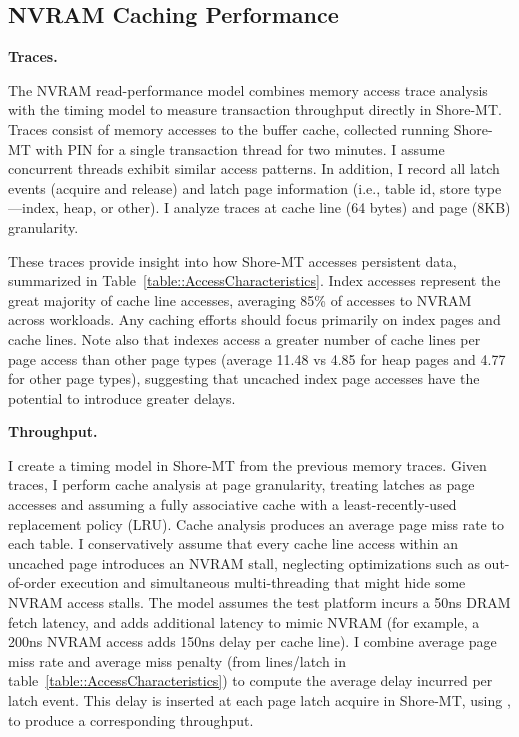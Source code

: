 \subsection{NVRAM Caching Performance}
\label{sec:OLTP_eval:Reads:Performance}

\textbf{Traces.}

The NVRAM read-performance model combines memory access trace analysis with the timing model to measure transaction throughput directly in Shore-MT.
Traces consist of memory accesses to the buffer cache, collected running Shore-MT with PIN for a single transaction thread for two minutes.
I assume concurrent threads exhibit similar access patterns.
In addition, I record all latch events (acquire and release) and latch page information (i.e., table id, store type---index, heap, or other).
I analyze traces at cache line (64 bytes) and page (8KB) granularity.

These traces provide insight into how Shore-MT accesses persistent data, summarized in Table~\ref{table::AccessCharacteristics}.
Index accesses represent the great majority of cache line accesses, averaging 85\% of accesses to NVRAM across workloads.
Any caching efforts should focus primarily on index pages and cache lines.
Note also that indexes access a greater number of cache lines per page access than other page types (average 11.48 vs 4.85 for heap pages and 4.77 for other page types), suggesting that uncached index page accesses have the potential to introduce greater delays.

\textbf{Throughput.}

I create a timing model in Shore-MT from the previous memory traces.
Given traces, I perform cache analysis at page granularity, treating latches as page accesses and assuming a fully associative cache with a least-recently-used replacement policy (LRU).
Cache analysis produces an average page miss rate to each table.
I conservatively assume that every cache line access within an uncached page introduces an NVRAM stall, neglecting optimizations such as out-of-order execution and simultaneous multi-threading that might hide some NVRAM access stalls. 
The model assumes the test platform incurs a 50ns DRAM fetch latency, and adds additional latency to mimic NVRAM (for example, a 200ns NVRAM access adds 150ns delay per cache line).
I combine average page miss rate and average miss penalty (from lines/latch in table~\ref{table::AccessCharacteristics}) to compute the average delay incurred per latch event.
This delay is inserted at each page latch acquire in Shore-MT, using \InPlace, to produce a corresponding throughput.

